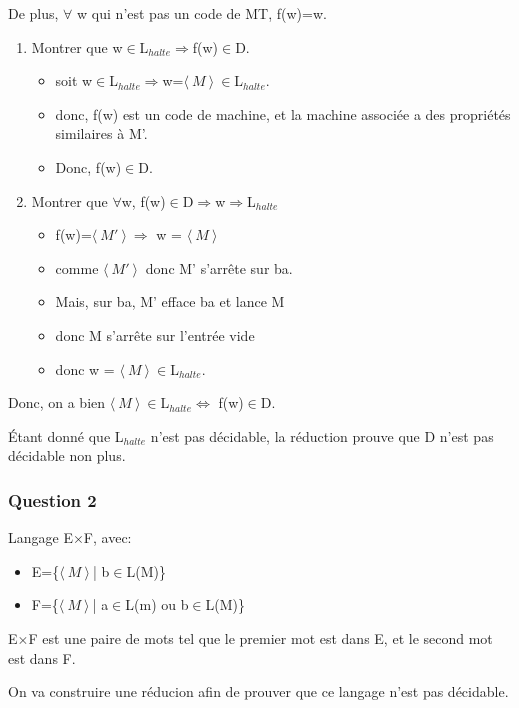 De plus, $\forall$ w qui n'est pas un code de MT, f(w)=w.

\begin{enumerate}
  \item Montrer que w$\in$L$_{halte}\Rightarrow$f(w)$\in$D.
  \begin{itemize}
    \item soit w$\in$L$_{halte}\Rightarrow$w=$\langle\ M\ \rangle \!\ \in$L$_{halte}$.
    \item donc, f(w) est un code de machine, et la machine associée a des propriétés similaires à M'.
    \item Donc, f(w)$\in$D.
  \end{itemize}
  \item Montrer que $\forall$w, f(w)$\in$D$\Rightarrow$w$\Rightarrow$L$_{halte}$
  \begin{itemize}
    \item f(w)=$\langle\ M'\ \rangle \!\ \Rightarrow$ w = $\langle\ M\ \rangle \!\ $
    \item comme $\langle\ M'\ \rangle \!\ $ donc M' s'arrête sur ba.
    \item Mais, sur ba, M' efface ba et lance M
    \item donc M s'arrête sur l'entrée vide
    \item donc w = $\langle\ M\ \rangle \!\ \in$L$_{halte}$.
  \end{itemize}
\end{enumerate}

Donc, on a bien $\langle\ M\ \rangle \!\ \in$L$_{halte}\Leftrightarrow$ f(w)$\in$D.

Étant donné que L$_{halte}$ n'est pas décidable, la réduction prouve que D n'est pas décidable non plus.

\subsubsection{Question 2}

Langage E$\times$F, avec:
\begin{itemize}
  \item E=\{$\langle\ M\ \rangle \!\ $| b$\in$L(M)\}
  \item F=\{$\langle\ M\ \rangle \!\ $| a$\in$L(m) ou b$\in$L(M)\}
\end{itemize}

E$\times$F est une paire de mots tel que le premier mot est dans E, et le second mot est dans F.

On va construire une réducion afin de prouver que ce langage n'est pas décidable.

